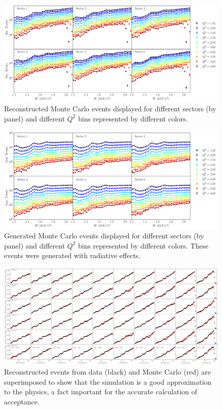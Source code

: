 \begin{figure}
	\centering
	\label{fig-rec-events} 
	\includegraphics[width=\textwidth]{image/plots/inclusive/rec_events_superimposed.pdf}
	\caption{Reconstructed Monte Carlo events displayed for different sectors (by panel) and different $Q^2$ bins represented by different colors.}
\end{figure}

\begin{figure}
	\centering
	\label{fig-gen-events} 
	\includegraphics[width=\textwidth]{image/plots/inclusive/gen_events_superimposed.pdf}
	\caption{Generated Monte Carlo events displayed for different sectors (by panel) and different $Q^2$ bins represented by different colors.  These events were generated with radiative effects.}
\end{figure}

\begin{figure}
	\centering
	\label{fig-data-rec-grid} 
	\includegraphics[width=\textwidth]{image/plots/inclusive/compare_data_rec_grid.pdf}
	\caption{Reconstructed events from data (black) and Monte Carlo (red) are superimposed to show that the simulation is a good approximation to the physics, a fact important for the accurate calculation of acceptance.}
\end{figure}

